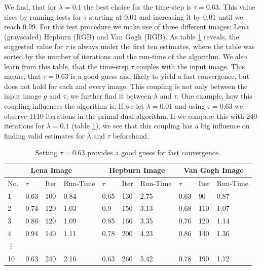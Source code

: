 \documentclass{scrreprt}
\begin{document}
            We find, that for $\lambda = 0.1$ the best choice for the time-step is $\tau = 0.63$. This value rises by running tests for $\tau$ starting at $0.01$ and increasing it by $0.01$ until we reach $0.99$. For this test procedure we make use of three different images: Lena (grayscaled) Hepburn (RGB) and Van Gogh (RGB). As table \ref{tab:best_tau_compare} reveals, the suggested value for $\tau$ is always under the first ten estimates, where the table was sorted by the number of iterations and the run-time of the algorithm. We also learn from this table, that the time-step $\tau$ couples with the input image. This means, that $\tau = 0.63$ is a good guess and likely to yield a fast convergence, but does not hold for each and every image. This coupling is not only between the input image $g$ and $\tau$, we further find it between $\lambda$ and $\tau$. One example, how this coupling influences the algorithm is, If we let $\lambda = 0.01$ and using $\tau = 0.63$ we observe 1110 iterations in the primal-dual algorithm. If we compare this with 240 iterations for $\lambda = 0.1$ (table \ref{tab:best_tau_compare}), we see that this coupling has a big influence on finding valid estimates for $\lambda$ and $\tau$ beforehand.

            \begin{table}[!ht]
                \centering
                \begin{tabular}{| l | l | l | l | l | l | l | l | l | l |}
                    \hline
                    \multicolumn{4}{|c|}{Lena Image} & \multicolumn{3}{|c|}{Hepburn Image} & \multicolumn{3}{|c|}{Van Gogh Image} \\ \hline\hline
                    No. & $\tau$ & Iter & Run-Time & $\tau$ & Iter & Run-Time & $\tau$ & Iter & Run-Time \\ \hline
                    1 & 0.63 & 100 & 0.84 & 0.65 & 130 & 2.75 & 0.63 & 90 & 0.87 \\ \hline
                    2 & 0.74 & 120 & 1.03 & 0.9 & 150 & 3.13 & 0.68 & 110 & 1.07 \\ \hline
                    3 & 0.86 & 120 & 1.09 & 0.85 & 160 & 3.35 & 0.76 & 120 & 1.14 \\ \hline
                    4 & 0.94 & 140 & 1.11 & 0.78 & 200 & 4.23 & 0.86 & 140 & 1.36 \\ \hline
                    \vdots &  &  &  &  &  &  &  &  &  \\ \hline
                    10 & 0.63 & 240 & 2.16 & 0.63 & 260 & 5.42 & 0.78 & 190 & 1.72 \\ \hline
                \end{tabular}
                \caption[Best estimate of $\tau$ for the ROF model.]{Setting $\tau = 0.63$ provides a good guess for fast convergence.}
                \label{tab:best_tau_compare}
            \end{table}
\end{document}
